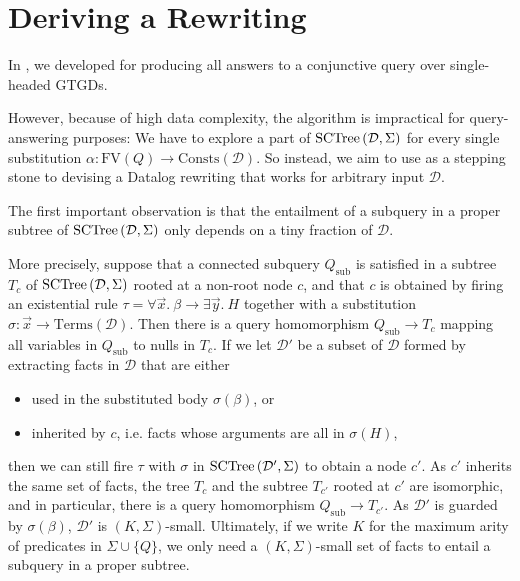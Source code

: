 \documentclass[12pt]{report}
\theoremstyle{plain}
\theoremstyle{definition}
\def\FV{{\mathrm{FV}}}
\def\Consts{{\mathrm{Consts}}}
\def\Terms{{\mathrm{Terms}}}
\newcommand{\SCTree}[2]{\ensuremath{\normalfont{\textrm{SCTree}} \left( #1, #2 \right)}}
\begin{document}
\newpage
\chapter{Deriving a Rewriting}\label{deriving-a-rewriting}

In , we developed  for producing all answers to a conjunctive query over single-headed GTGDs.

However, because of high data complexity, the algorithm is impractical for query-answering purposes: We have to explore a part of $\SCTree{\mathcal{D}}{\Sigma}$ for every single substitution $\alpha: \FV(Q) \rightarrow \Consts(\mathcal{D})$. So instead, we aim to use  as a stepping stone to devising a Datalog rewriting that works for arbitrary input $\mathcal{D}$.

The first important observation is that the entailment of a subquery in a proper subtree of $\SCTree{\mathcal{D}}{\Sigma}$ only depends on a tiny fraction of $\mathcal{D}$.

More precisely, suppose that a connected subquery $Q_\mathrm{sub}$ is satisfied in a subtree $T_c$ of $\SCTree{\mathcal{D}}{\Sigma}$ rooted at a non-root node $c$, and that $c$ is obtained by firing an existential rule $\tau = \forall \vec{x}.\ \beta \rightarrow \exists \vec{y}.\ H$ together with a substitution $\sigma: \vec{x} \rightarrow \Terms(\mathcal{D})$. Then there is a query homomorphism $Q_\mathrm{sub} \rightarrow T_c$ mapping all variables in $Q_\mathrm{sub}$ to nulls in $T_c$. If we let $\mathcal{D'}$ be a subset of $\mathcal{D}$ formed by extracting facts in $\mathcal{D}$ that are either
\begin{itemize}
  \item used in the substituted body $\sigma(\beta)$, or
  \item inherited by $c$, i.e. facts whose arguments are all in $\sigma(H)$,
\end{itemize}
then we can still fire $\tau$ with $\sigma$ in $\SCTree{\mathcal{D'}}{\Sigma}$ to obtain a node $c'$. As $c'$ inherits the same set of facts, the tree $T_c$ and the subtree $T_{c'}$ rooted at $c'$ are isomorphic, and in particular, there is a query homomorphism $Q_\mathrm{sub} \rightarrow T_{c'}$. As $\mathcal{D'}$ is guarded by $\sigma(\beta)$, $\mathcal{D'}$ is $(K, \Sigma)$-small. Ultimately, if we write $K$ for the maximum arity of predicates in $\Sigma \cup \{Q\}$, we only need a $(K, \Sigma)$-small set of facts to entail a subquery in a proper subtree.
\end{document}
